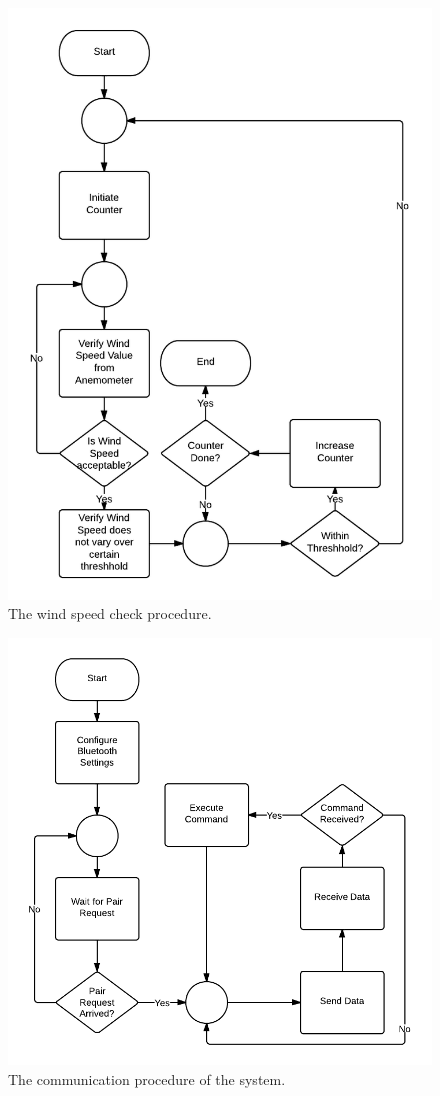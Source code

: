 	\begin{figure}[H]
		\centering
			\includegraphics[scale=0.40]{img/flowchart-windspeedcheck}
		\caption{The wind speed check procedure.}
	\end{figure}
	\begin{figure}[H]
		\centering
			\includegraphics[scale=0.40]{img/flowchart-communication-bluetooth}
		\caption{The communication procedure of the system.}
	\end{figure}

\newpage